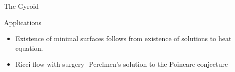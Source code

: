 \documentclass[usenames,dvipsnames]{beamer}
\theoremstyle{definition}
\theoremstyle{theorem}
\begin{document}
\begin{frame}{The Gyroid}
\end{frame}

\begin{frame}{Applications}
\begin{itemize}
    \item Existence of minimal surfaces follows from existence of solutions to heat equation.
    \item Ricci flow with surgery- Perelmen's solution to the Poincare conjecture
\end{itemize}
\end{frame}
        
        
    
\end{document}

